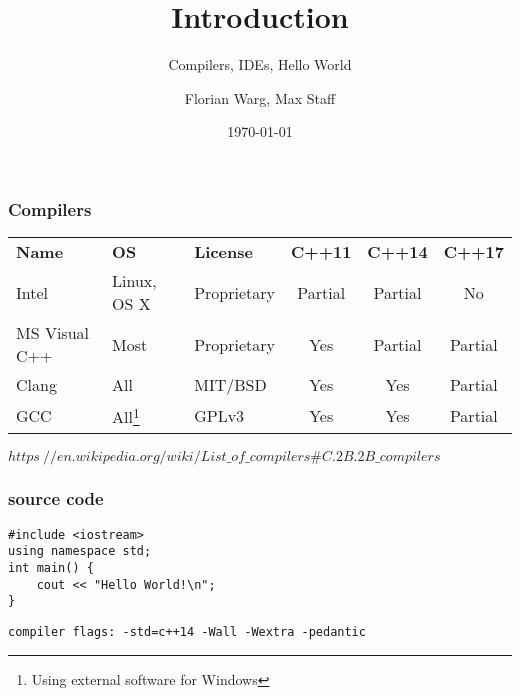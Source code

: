 



\title{Introduction}
\subtitle{Compilers, IDEs, Hello World}
\date{\today}
\author{Florian Warg, Max Staff}

\maketitle

\begin{frame}[fragile]
    \frametitle{Compilers}
    \begin{tabular}{lllccc}
    	\textbf{Name} & \textbf{OS} & \textbf{License} & \textbf{C++11} & \textbf{C++14} & \textbf{C++17} \\
    	Intel & Linux, OS X & Proprietary & Partial & Partial & No \\
    	MS Visual C++ & Most & Proprietary & Yes & Partial & Partial \\
    	Clang & All & MIT/BSD & Yes & Yes & Partial \\
    	GCC & All\footnote{Using external software for Windows} & GPLv3 & Yes & Yes & Partial \\
    \end{tabular} \bigskip
    $https\://en.wikipedia.org/wiki/List\_of\_compilers\#C.2B.2B\_compilers$
\end{frame}

\begin{frame}[fragile]
    \frametitle{source code}
\begin{lstlisting}
#include <iostream>
using namespace std;
int main() {
    cout << "Hello World!\n";
}
\end{lstlisting}
\begin{lstlisting}[numbers=none]
compiler flags: -std=c++14 -Wall -Wextra -pedantic
\end{lstlisting}
\end{frame}



